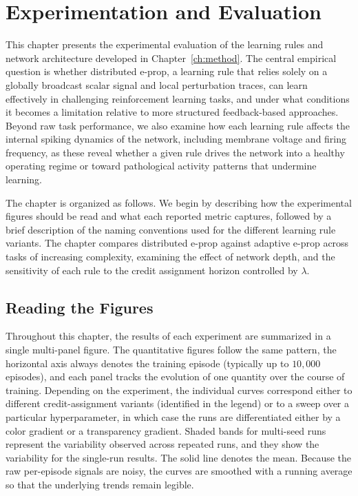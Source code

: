 
\chapter{Experimentation and Evaluation}
\label{ch:results}

This chapter presents the experimental evaluation of the learning rules and
network architecture developed in Chapter~\ref{ch:method}. The central
empirical question is whether distributed e-prop, a learning rule that relies
solely on a globally broadcast scalar signal and local perturbation traces,
can learn effectively in challenging reinforcement learning tasks, and under
what conditions it becomes a limitation relative to more structured
feedback-based approaches. Beyond raw task performance, we also examine how
each learning rule affects the internal spiking dynamics of the network,
including membrane voltage and firing frequency, as these reveal whether a
given rule drives the network into a healthy operating regime or toward
pathological activity patterns that undermine learning.

The chapter is organized as follows. We begin by describing how the
experimental figures should be read and what each reported metric captures, followed by a brief description of the
naming conventions used for the different learning rule variants.
The chapter compares distributed e-prop against adaptive
e-prop across tasks of increasing complexity, examining the effect of network
depth, and the sensitivity of each rule to the
credit assignment horizon controlled by $\lambda$.

\section{Reading the Figures}
\label{sec:reading-figures}
Throughout this chapter, the results of each experiment are summarized in a single multi-panel 
figure. The quantitative figures follow the same pattern, the horizontal axis always denotes the training 
episode (typically up to $10{,}000$ episodes), and each panel tracks the evolution of one quantity 
over the course of training. Depending on the experiment, the individual curves correspond either 
to different credit-assignment variants (identified in the legend) or to a sweep over a particular hyperparameter, in which case the runs are differentiated either by a color gradient or a transparency gradient. Shaded bands for multi-seed runs represent the variability observed 
across repeated runs, and they show the variability for the single-run results. The solid line denotes the mean. Because the raw per-episode signals 
are noisy, the curves are smoothed with a running average so that the underlying trends remain 
legible.

